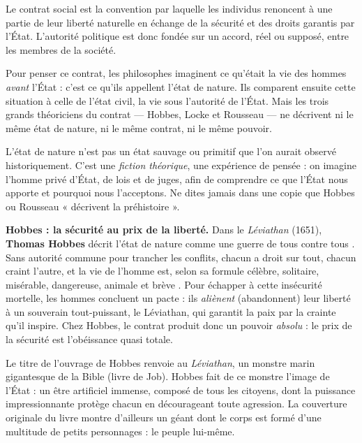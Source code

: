 \documentclass[11pt]{article}
\newcommand{\cle}[1]{{\popxbold\color{popdark}#1}}
\begin{document}
\begin{definition}
Le \cle{contrat social} est la convention par laquelle les individus renoncent à une partie de leur liberté naturelle en échange de la sécurité et des droits garantis par l'État. L'autorité politique est donc fondée sur un accord, réel ou supposé, entre les membres de la société.
\end{definition}

Pour penser ce contrat, les philosophes imaginent ce qu'était la vie des hommes \emph{avant} l'État : c'est ce qu'ils appellent l'\cle{état de nature}. Ils comparent ensuite cette situation à celle de l'\cle{état civil}, la vie sous l'autorité de l'État. Mais les trois grands théoriciens du contrat — Hobbes, Locke et Rousseau — ne décrivent ni le même état de nature, ni le même contrat, ni le même pouvoir.

\begin{attention}
L'\cle{état de nature} n'est pas un état sauvage ou primitif que l'on aurait observé historiquement. C'est une \emph{fiction théorique}, une expérience de pensée : on imagine l'homme privé d'État, de lois et de juges, afin de comprendre ce que l'État nous apporte et pourquoi nous l'acceptons. Ne dites jamais dans une copie que Hobbes ou Rousseau « décrivent la préhistoire ».
\end{attention}

\textbf{Hobbes : la sécurité au prix de la liberté.} Dans le \emph{Léviathan} (1651), \textbf{Thomas Hobbes} décrit l'état de nature comme une \og guerre de tous contre tous \fg. Sans autorité commune pour trancher les conflits, chacun a droit sur tout, chacun craint l'autre, et la vie de l'homme est, selon sa formule célèbre, \og solitaire, misérable, dangereuse, animale et brève \fg. Pour échapper à cette insécurité mortelle, les hommes concluent un pacte : ils \emph{aliènent} (abandonnent) leur liberté à un \cle{souverain} tout-puissant, le Léviathan, qui garantit la paix par la crainte qu'il inspire. Chez Hobbes, le contrat produit donc un pouvoir \emph{absolu} : le prix de la sécurité est l'obéissance quasi totale.

\begin{savaistu}
Le titre de l'ouvrage de Hobbes renvoie au \emph{Léviathan}, un monstre marin gigantesque de la Bible (livre de Job). Hobbes fait de ce monstre l'image de l'État : un être artificiel immense, composé de tous les citoyens, dont la puissance impressionnante protège chacun en décourageant toute agression. La couverture originale du livre montre d'ailleurs un géant dont le corps est formé d'une multitude de petits personnages : le peuple lui-même.
\end{savaistu}
\end{document}
